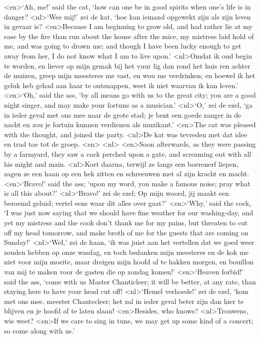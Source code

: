 <en>`Ah, me!' said the cat, `how can one be in good spirits when one's life is in danger?
<nl>`Wee mij!' zei de kat, `hoe kan iemand opgewekt zijn als zijn leven in gevaar is?
<en>Because I am beginning to grow old, and had rather lie at my ease by the fire than run about the house after the mice, my mistress laid hold of me, and was going to drown me; and though I have been lucky enough to get away from her, I do not know what I am to live upon.'
<nl>Omdat ik oud begin te worden, en liever op mijn gemak bij het vuur lig dan rond het huis ren achter de muizen, greep mijn meesteres me vast, en wou me verdrinken; en hoewel ik het geluk heb gehad aan haar te ontsnappen, weet ik niet waarvan ik kan leven.'
<en>`Oh,' said the ass, `by all means go with us to the great city; you are a good night singer, and may make your fortune as a musician.'
<nl>`O,' zei de ezel, `ga in ieder geval met ons mee naar de grote stad; je bent een goede zanger in de nacht en zou je fortuin kunnen verdienen als muzikant.'
<en>The cat was pleased with the thought, and joined the party.
<nl>De kat was tevreden met dat idee en trad toe tot de groep.
<en>
<nl>
<en>Soon afterwards, as they were passing by a farmyard, they saw a cock perched upon a gate, and screaming out with all his might and main.
<nl>Kort daarna, terwijl ze langs een boerenerf liepen, zagen ze een haan op een hek zitten en schreeuwen met al zijn kracht en macht.
<en>`Bravo!' said the ass; `upon my word, you make a famous noise; pray what is all this about?'
<nl>`Bravo!' zei de ezel; Op mijn woord, jij  maakt een beroemd geluid; vertel eens waar  dit alles over gaat?'
<en>`Why,' said the cock, `I was just now saying that we should have fine weather for our washing-day, and yet my mistress and the cook don't thank me for my pains, but threaten to cut off my head tomorrow, and make broth of me for the guests that are coming on Sunday!'
<nl>`Wel,' zei de haan, `ik was juist aan het vertellen dat we goed weer zouden hebben op onze wasdag, en toch bedanken mijn meesteres en de kok me niet voor mijn moeite, maar dreigen  mijn hoofd af te hakken morgen, en  bouillon van mij te maken voor de gasten die op zondag komen!'
<en>`Heaven forbid!' said the ass, `come with us Master Chanticleer; it will be better, at any rate, than staying here to have your head cut off!
<nl>`Hemel verhoede!' zei de ezel, `kom met ons mee, meester Chantecleer; het zal in ieder geval beter zijn dan hier te blijven en  je hoofd af te laten slaan!
<en>Besides, who knows?
<nl>Trouwens, wie weet?
<en>If we care to sing in tune, we may get up some kind of a concert; so come along with us.'

